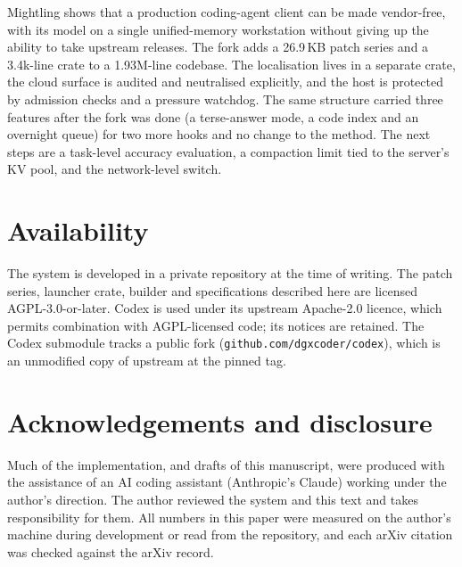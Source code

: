 \documentclass[11pt]{article}
\newcommand{\code}[1]{\texttt{#1}}
\begin{document}
Mightling shows that a production coding-agent client can be made vendor-free, with its model on a single
unified-memory workstation without giving up the ability to take upstream releases. The fork adds
a 26.9\,KB patch series and a 3.4k-line crate to a 1.93M-line codebase. The localisation lives in a separate crate, the cloud
surface is audited and neutralised explicitly, and the host is protected by admission checks and a
pressure watchdog. The same structure carried three features after the fork was done (a
terse-answer mode, a code index and an overnight queue) for two more hooks and no change to the
method. The next steps are a task-level accuracy evaluation, a compaction limit tied to the
server's KV pool, and the network-level switch.

\section*{Availability}
The system is developed in a private repository at the time of writing. The patch series, launcher
crate, builder and specifications described here are licensed AGPL-3.0-or-later. Codex is used
under its upstream Apache-2.0 licence, which permits combination with AGPL-licensed code; its
notices are retained. The Codex submodule tracks a public fork (\code{github.com/dgxcoder/codex}),
which is an unmodified copy of upstream at the pinned tag.

\section*{Acknowledgements and disclosure}
Much of the implementation, and drafts of this manuscript, were produced with the assistance of
an AI coding assistant (Anthropic's Claude) working under the author's direction. The author
reviewed the system and this text and takes responsibility for them. All numbers in this paper
were measured on the author's machine during development or read from the repository, and each
arXiv citation was checked against the arXiv record.



\end{document}
